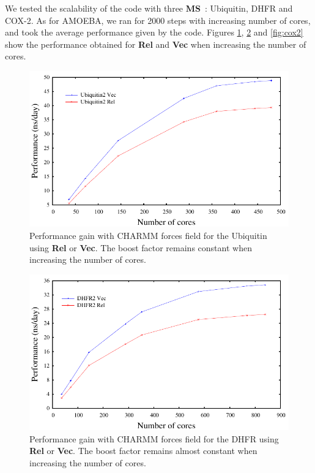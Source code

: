\documentclass[9pt,comparison]{livecoms}
\begin{document}
\hspace{\parindent} We tested the scalability of the code with three \textbf{MS}~: Ubiquitin, DHFR and COX-2. As for AMOEBA, we ran for 2000 steps with increasing number of cores, and took the average performance given by the code. Figures \ref{fig:ubiquitin}, \ref{fig:dhfr} and \ref{fig:cox2} show the performance obtained for \textbf{Rel} and \textbf{Vec} when increasing the number of cores.
\begin{figure}[htb!]
\centering
\includegraphics[scale=0.7]{ubiquitin2.pdf}
\caption{Performance gain with CHARMM forces field for the Ubiquitin using \textbf{Rel} or \textbf{Vec}. The boost factor remains constant when increasing the number of cores.}
\label{fig:ubiquitin}
\end{figure}
\begin{figure}[htb!]
\centering
\includegraphics[scale=0.7]{dhfr2.pdf}
\caption{Performance gain with CHARMM forces field for the DHFR using \textbf{Rel} or \textbf{Vec}. The boost factor remains almost constant when increasing the number of cores.}
\label{fig:dhfr}
\end{figure}
\end{document}
